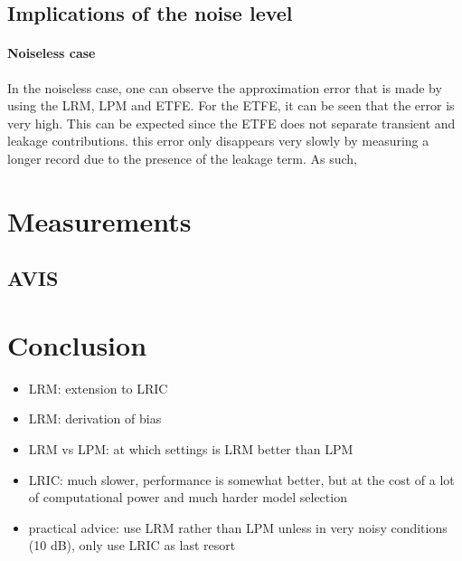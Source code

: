  \subsection{Implications of the noise level}

\paragraph{Noiseless case}
In the noiseless case, one can observe the approximation error that is made by using the \gls{LRM}, \gls{LPM} and \gls{ETFE}.
For the \gls{ETFE}, it can be seen that the error is very high.
This can be expected since the \gls{ETFE} does not separate transient and leakage contributions.
this error only disappears very slowly by measuring a longer record due to the presence of the leakage term.
As such, 


  \section{Measurements}
  \label{sec:measurements}
   \subsection{AVIS}

  \section{Conclusion}
  \label{sec:conclusion}

  \begin{itemize}
    \item LRM: extension to LRIC
    \item LRM: derivation of bias
    \item LRM vs LPM: at which settings is LRM better than LPM
    \item LRIC: much slower, performance is somewhat better, but at the cost of a lot of computational power and much harder model selection
    \item practical advice: use LRM rather than LPM unless in very noisy conditions (10 dB), only use LRIC as last resort
  \end{itemize}

